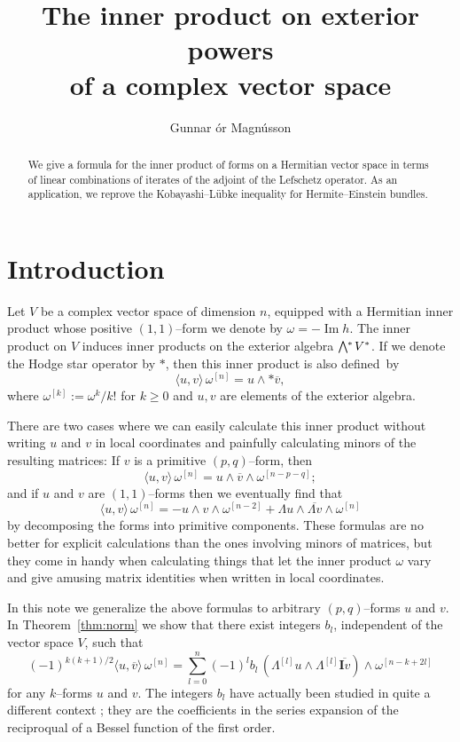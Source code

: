 \documentclass[11pt,a4paper]{amsart}
\title[The inner product of complex forms]
{The inner product on exterior powers\\ of a complex vector space}
\author{Gunnar \TH\'{o}r Magn\'{u}sson}
\def\^#1{^{[#1]}}
\def\bw#1{\bigwedge{}^{\mkern-5mu #1}\mkern2mu}
\def\I{\mathbf{I}}
\def\Im{\operatorname{Im}}
\theoremstyle{definition}
\theoremstyle{remark}
\numberwithin{equation}{section}
\begin{document}
\begin{abstract}
We give a formula for the inner product of forms on a Hermitian vector
space in terms of linear combinations of iterates of the adjoint of the
Lefschetz operator.  As an application, we reprove the
Kobayashi--L\"{u}bke inequality for Hermite--Einstein bundles. 
\end{abstract}


\maketitle 



\section*{Introduction}


Let $V$ be a complex vector space of dimension $n$, equipped with a
Hermitian inner product whose positive $(1,1)$--form we denote by $\omega =
-\Im h$. The inner product on $V$ induces inner products on the exterior
algebra $\bw{*} V^*$. If we denote the Hodge star operator by $*$, then
this inner product is also defined~by%
$$
\langle u, v\rangle \, \omega\^n 
= u \wedge *\overline v,
$$ 
where $\omega\^k := \omega^k / k!$ for $k \geq 0$ and $u,v$ are elements
of the exterior algebra.

There are two cases where we can easily calculate this inner product
without writing $u$ and $v$ in local coordinates and painfully calculating
minors of the resulting matrices: If $v$ is a primitive
$(p,q)$--form, then
$$
\langle u, v\rangle \, \omega\^n 
= u \wedge \overline v \wedge \omega\^{n-p-q};
$$ 
and if $u$ and $v$ are $(1,1)$--forms then we eventually find that
$$
\langle u, v\rangle \, \omega\^n 
= - u \wedge v \wedge \omega\^{n-2}
+\Lambda u \wedge \overline{\Lambda v} \wedge \omega\^{n}
$$
by decomposing the forms into primitive components. These formulas are 
no better for explicit calculations than the ones involving minors of
matrices, but they come in handy when calculating things that let the
inner product $\omega$ vary and give amusing matrix identities when
written in local coordinates.

In this note we generalize the above formulas to arbitrary $(p,q)$--forms
$u$ and $v$. In Theorem~\ref{thm:norm} we show that there exist integers
$b_l$, independent of the vector space $V$, such that
$$
    (-1)^{k(k+1)/2}
    \langle u, \overline v \rangle \, \omega\^n
    = \sum_{l=0}^n (-1)^{l} b_l \, 
    (\Lambda\^l u \wedge \Lambda\^l \overline{\I v})
    \wedge \omega\^{n-k+2l}
$$
for any $k$--forms $u$ and $v$. The integers $b_l$ have actually been
studied in quite a different context \cite{Carlitz,Riordan,OEIS}; they are
the coefficients in the series expansion of the reciproqual of a Bessel
function of the first order. 
\end{document}
